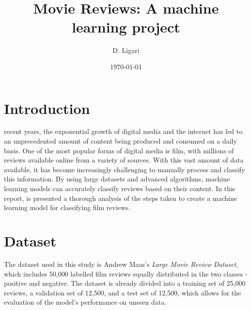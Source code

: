 \documentclass[eng]{class}
\title{Movie Reviews: A machine learning project}
\author[1]{D. Ligari}
\affil[1]{University of Pavia, Department of Computer Engineering (Data Science), Pavia, Italy}
\date{\today}
\begin{document}
\maketitle
\thispagestyle{fancy}
\section{Introduction}
recent years, the exponential growth of digital media and the internet has led to an unprecedented amount of content being produced and consumed on a daily basis.
One of the most popular forms of digital media is film, with millions of reviews available online from a variety of sources. With this vast amount of data available,
it has become increasingly challenging to manually process and classify this information.
By using large datasets and advanced algorithms, machine learning models can accurately classify reviews based on their content.
In this report, is presented a thorough analysis of the steps taken to create a machine learning model for classifying film reviews.
\section{Dataset}
The dataset used in this study is Andrew Maas's \textit{Large Movie Review Dataset},
which includes 50,000 labelled film reviews equally distributed in the two classes - positive and negative.
The dataset is already divided into a training set of 25,000 reviews, a validation set of 12,500, and a test set of 12,500,
which allows for the evaluation of the model's performance on unseen data.
\end{document}
